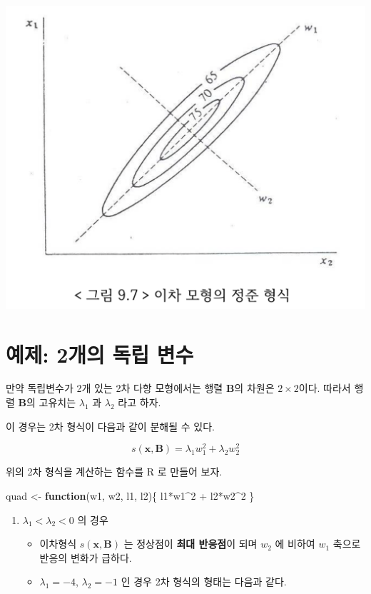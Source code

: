\documentclass[
]{book}
\newenvironment{Shaded}{\begin{snugshade}}{\end{snugshade}}
\newcommand{\ControlFlowTok}[1]{\textcolor[rgb]{0.13,0.29,0.53}{\textbf{#1}}}
\newcommand{\DecValTok}[1]{\textcolor[rgb]{0.00,0.00,0.81}{#1}}
\newcommand{\NormalTok}[1]{#1}
\newcommand{\OtherTok}[1]{\textcolor[rgb]{0.56,0.35,0.01}{#1}}
\newcommand{\SpecialCharTok}[1]{\textcolor[rgb]{0.00,0.00,0.00}{#1}}
\newcommand{\bm}[1]{\boldsymbol{\mathbf{#1}}}
\theoremstyle{definition}
\theoremstyle{definition}
\theoremstyle{definition}
\theoremstyle{definition}
\theoremstyle{remark}
\begin{document}
\begin{center}\includegraphics[width=0.6\linewidth]{myimages/canonical} \end{center}

\hypertarget{uxc608uxc81c-2uxac1cuxc758-uxb3c5uxb9bd-uxbcc0uxc218}{%
\section{예제: 2개의 독립 변수}\label{uxc608uxc81c-2uxac1cuxc758-uxb3c5uxb9bd-uxbcc0uxc218}}

만약 독립변수가 2개 있는 2차 다항 모형에서는 행렬 \(\bm B\)의 차원은 \(2 \times 2\)이다.
따라서 행렬 \(\bm B\)의 고유치는 \(\lambda_1\) 과 \(\lambda_2\) 라고 하자.

이 경우는 2차 형식이 다음과 같이 분해될 수 있다.

\[ s(\bm x, \bm B) = \lambda_1 w_1^2 + \lambda_2 w_2^2 \]

위의 2차 형식을 계산하는 함수를 R 로 만들어 보자.

\begin{Shaded}
\begin{Highlighting}[]
\NormalTok{quad }\OtherTok{\textless{}{-}} \ControlFlowTok{function}\NormalTok{(w1, w2, l1, l2)\{}
\NormalTok{  l1}\SpecialCharTok{*}\NormalTok{w1}\SpecialCharTok{\^{}}\DecValTok{2} \SpecialCharTok{+}\NormalTok{ l2}\SpecialCharTok{*}\NormalTok{w2}\SpecialCharTok{\^{}}\DecValTok{2}
\NormalTok{\}}
\end{Highlighting}
\end{Shaded}

\begin{enumerate}
\def\labelenumi{\arabic{enumi}.}
\item
  \(\lambda_1 < \lambda_2 < 0\) 의 경우

  \begin{itemize}
  \item
    이차형식 \(s(\bm x, \bm B)\) 는 정상점이 \textbf{최대 반응점}이 되며 \(w_2\) 에 비하여 \(w_1\) 축으로 반응의 변화가 급하다.
  \item
    \(\lambda_1 =-4\), \(\lambda_2 =-1\) 인 경우 2차 형식의 형태는 다음과 같다.
  \end{itemize}
\end{enumerate}
\end{document}
